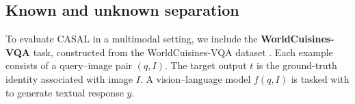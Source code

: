 \documentclass{article} %
\newcommand{\known}[1]{\textcolor{KnownGreen}{#1}}
\begin{document}




\subsection{Known and unknown separation}  

To evaluate CASAL in a multimodal setting, we include the \textbf{ WorldCuisines-VQA} task, constructed from the  WorldCuisines-VQA dataset \citep{winata2024worldcuisines}.%
Each example consists of a query–image pair $(q, I)$. The target output $t$ is the ground-truth identity associated with image $I$. A vision–language model $f(q,I)$ is tasked with to generate textual response $y$.
\end{document}
